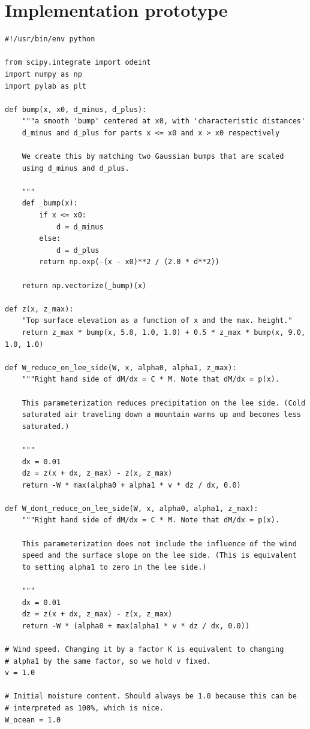 \documentclass[11pt]{article}
\begin{document}
\section{Implementation prototype}
\label{sec-2}
\begin{verbatim}
#!/usr/bin/env python

from scipy.integrate import odeint
import numpy as np
import pylab as plt

def bump(x, x0, d_minus, d_plus):
    """a smooth 'bump' centered at x0, with 'characteristic distances'
    d_minus and d_plus for parts x <= x0 and x > x0 respectively

    We create this by matching two Gaussian bumps that are scaled
    using d_minus and d_plus.

    """
    def _bump(x):
        if x <= x0:
            d = d_minus
        else:
            d = d_plus
        return np.exp(-(x - x0)**2 / (2.0 * d**2))

    return np.vectorize(_bump)(x)

def z(x, z_max):
    "Top surface elevation as a function of x and the max. height."
    return z_max * bump(x, 5.0, 1.0, 1.0) + 0.5 * z_max * bump(x, 9.0, 1.0, 1.0)

def W_reduce_on_lee_side(W, x, alpha0, alpha1, z_max):
    """Right hand side of dM/dx = C * M. Note that dM/dx = p(x).

    This parameterization reduces precipitation on the lee side. (Cold
    saturated air traveling down a mountain warms up and becomes less
    saturated.)

    """
    dx = 0.01
    dz = z(x + dx, z_max) - z(x, z_max)
    return -W * max(alpha0 + alpha1 * v * dz / dx, 0.0)

def W_dont_reduce_on_lee_side(W, x, alpha0, alpha1, z_max):
    """Right hand side of dM/dx = C * M. Note that dM/dx = p(x).

    This parameterization does not include the influence of the wind
    speed and the surface slope on the lee side. (This is equivalent
    to setting alpha1 to zero in the lee side.)

    """
    dx = 0.01
    dz = z(x + dx, z_max) - z(x, z_max)
    return -W * (alpha0 + max(alpha1 * v * dz / dx, 0.0))

# Wind speed. Changing it by a factor K is equivalent to changing
# alpha1 by the same factor, so we hold v fixed.
v = 1.0

# Initial moisture content. Should always be 1.0 because this can be
# interpreted as 100%, which is nice.
W_ocean = 1.0


\end{verbatim}
\end{document}
